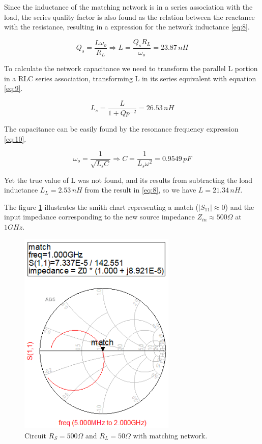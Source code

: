 Since the inductance of the matching network is in a series association with the load, the series quality factor is also found as the relation between the reactance with the resistance, resulting in a expression for the network inductance \ref{eq:8}.

\begin{equation} \label{eq:8}
    Q_s = \frac{L\omega_o}{R_L} \Longrightarrow L = \frac{Q_sR_L}{\omega_o} = 23.87 \, nH
\end{equation}

To calculate the network capacitance we need to transform the parallel L portion in a RLC series association, transforming L in its series equivalent with equation \ref{eq:9}.

\begin{equation} \label{eq:9}
    L_s = \frac{L}{1+Qp^{-2}} = 26.53 \, nH
\end{equation}

The capacitance can be easily found by the resonance frequency expression \ref{eq:10}.

\begin{equation} \label{eq:10}
    \omega_o = \frac{1}{\sqrt{L_sC}} \Longrightarrow C = \frac{1}{L_s \omega^2} = 0.9549 \, pF
\end{equation}

Yet the true value of L was not found, and its results from subtracting the load inductance $L_L = 2.53 \, nH$ from the result in \ref{eq:8}, so we have $L = 21.34 \, nH$.

The figure \ref{fig:smith4} illustrates the smith chart representing a match ($|S_{11}| \approx 0$) and the input impedance corresponding to the new source impedance $Z_{in} \approx 500 \Omega$ at $1 GHz$.

\begin{figure}[H] 
\centering
\includegraphics[width=7.5cm]{images/smith4.PNG}
\caption{Circuit $R_S=500 \Omega$ and $R_L=50 \Omega$ with matching network.}
\label{fig:smith4} 
\end{figure}

